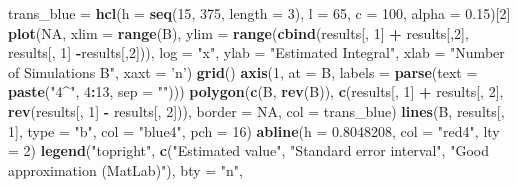 \documentclass[12pt,]{krantz}
\newenvironment{Shaded}{\begin{snugshade}}{\end{snugshade}}
\newcommand{\KeywordTok}[1]{\textcolor[rgb]{0.27,0.27,0.27}{\textbf{#1}}}
\newcommand{\DataTypeTok}[1]{\textcolor[rgb]{0.27,0.27,0.27}{#1}}
\newcommand{\DecValTok}[1]{\textcolor[rgb]{0.06,0.06,0.06}{#1}}
\newcommand{\FloatTok}[1]{\textcolor[rgb]{0.06,0.06,0.06}{#1}}
\newcommand{\StringTok}[1]{\textcolor[rgb]{0.5,0.5,0.5}{#1}}
\newcommand{\OtherTok}[1]{\textcolor[rgb]{0.37,0.37,0.37}{#1}}
\newcommand{\OperatorTok}[1]{\textcolor[rgb]{0.43,0.43,0.43}{\textbf{#1}}}
\newcommand{\NormalTok}[1]{#1}
\begin{document}
\begin{Shaded}
\begin{Highlighting}[]
\NormalTok{trans_blue =}\StringTok{ }\KeywordTok{hcl}\NormalTok{(}\DataTypeTok{h =} \KeywordTok{seq}\NormalTok{(}\DecValTok{15}\NormalTok{, }\DecValTok{375}\NormalTok{, }\DataTypeTok{length =} \DecValTok{3}\NormalTok{), }\DataTypeTok{l =} \DecValTok{65}\NormalTok{, }\DataTypeTok{c =} \DecValTok{100}\NormalTok{, }\DataTypeTok{alpha =} \FloatTok{0.15}\NormalTok{)[}\DecValTok{2}\NormalTok{]}
\KeywordTok{plot}\NormalTok{(}\OtherTok{NA}\NormalTok{, }\DataTypeTok{xlim =} \KeywordTok{range}\NormalTok{(B), }\DataTypeTok{ylim =} \KeywordTok{range}\NormalTok{(}\KeywordTok{cbind}\NormalTok{(results[, }\DecValTok{1}\NormalTok{] }\OperatorTok{+}\StringTok{ }\NormalTok{results[,}\DecValTok{2}\NormalTok{], }
\NormalTok{      results[, }\DecValTok{1}\NormalTok{] }\OperatorTok{-}\NormalTok{results[,}\DecValTok{2}\NormalTok{])), }\DataTypeTok{log =} \StringTok{"x"}\NormalTok{, }\DataTypeTok{ylab =} \StringTok{"Estimated Integral"}\NormalTok{,}
      \DataTypeTok{xlab =} \StringTok{"Number of Simulations B"}\NormalTok{, }\DataTypeTok{xaxt =} \StringTok{'n'}\NormalTok{)}
\KeywordTok{grid}\NormalTok{()}
\KeywordTok{axis}\NormalTok{(}\DecValTok{1}\NormalTok{, }\DataTypeTok{at =}\NormalTok{ B, }\DataTypeTok{labels =} \KeywordTok{parse}\NormalTok{(}\DataTypeTok{text =} \KeywordTok{paste}\NormalTok{(}\StringTok{"4^"}\NormalTok{, }\DecValTok{4}\OperatorTok{:}\DecValTok{13}\NormalTok{, }\DataTypeTok{sep =} \StringTok{""}\NormalTok{)))}
\KeywordTok{polygon}\NormalTok{(}\KeywordTok{c}\NormalTok{(B, }\KeywordTok{rev}\NormalTok{(B)), }\KeywordTok{c}\NormalTok{(results[, }\DecValTok{1}\NormalTok{] }\OperatorTok{+}\StringTok{ }\NormalTok{results[, }\DecValTok{2}\NormalTok{], }
                        \KeywordTok{rev}\NormalTok{(results[, }\DecValTok{1}\NormalTok{] }\OperatorTok{-}\StringTok{ }\NormalTok{results[, }\DecValTok{2}\NormalTok{])), }\DataTypeTok{border =} \OtherTok{NA}\NormalTok{, }\DataTypeTok{col =}\NormalTok{ trans_blue)}
\KeywordTok{lines}\NormalTok{(B, results[, }\DecValTok{1}\NormalTok{], }\DataTypeTok{type =} \StringTok{"b"}\NormalTok{, }\DataTypeTok{col =} \StringTok{"blue4"}\NormalTok{, }\DataTypeTok{pch =} \DecValTok{16}\NormalTok{)}
\KeywordTok{abline}\NormalTok{(}\DataTypeTok{h =} \FloatTok{0.8048208}\NormalTok{, }\DataTypeTok{col =} \StringTok{"red4"}\NormalTok{, }\DataTypeTok{lty =} \DecValTok{2}\NormalTok{)}
\KeywordTok{legend}\NormalTok{(}\StringTok{"topright"}\NormalTok{, }\KeywordTok{c}\NormalTok{(}\StringTok{"Estimated value"}\NormalTok{, }\StringTok{"Standard error interval"}\NormalTok{, }\StringTok{"Good approximation (MatLab)"}\NormalTok{), }\DataTypeTok{bty =} \StringTok{"n"}\NormalTok{,}

\end{Highlighting}
\end{Shaded}
\end{document}
